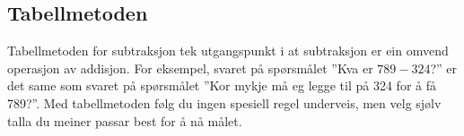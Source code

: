 \subsection{Tabellmetoden}
Tabellmetoden for subtraksjon tek utgangspunkt i at subtraksjon er ein omvend operasjon av addisjon. For eksempel, svaret på spørsmålet ''Kva er $ 789-324 $?'' er det same som svaret på spørsmålet ''Kor mykje må eg legge til på 324 for å få 789?''. Med tabellmetoden følg du ingen spesiell regel underveis, men velg sjølv talla du meiner passar best for å nå målet.\\
\begin{center}
\parbox{0.35\linewidth}{
} \qquad
\parbox{0.35\linewidth}{
	} \\[12pt]
\parbox{0.35\linewidth}{
	} \qquad 
\parbox{0.4\linewidth}{
	}
\end{center}
